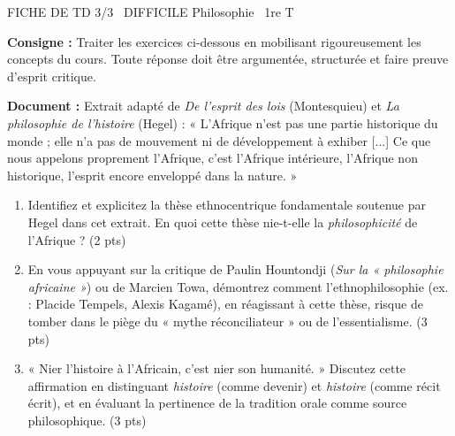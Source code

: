 \documentclass[11pt]{article}
\begin{document}
\begin{tcolorbox}[enhanced,colback=popink,colframe=popink,arc=10pt,boxrule=0pt,left=12pt,right=12pt,top=9pt,bottom=9pt]
{\color{white}\popxbold\small FICHE DE TD 3/3 \textbullet\ DIFFICILE \hfill Philosophie \textbullet\ 1re T\par}
\end{tcolorbox}
\vspace{4pt}
\noindent \textbf{Consigne :} Traiter les exercices ci-dessous en mobilisant rigoureusement les concepts du cours. Toute réponse doit être argumentée, structurée et faire preuve d'esprit critique.

\begin{exercice}
\textbf{Document :} Extrait adapté de \textit{De l'esprit des lois} (Montesquieu) et \textit{La philosophie de l'histoire} (Hegel) : « L'Afrique n'est pas une partie historique du monde ; elle n'a pas de mouvement ni de développement à exhiber [...] Ce que nous appelons proprement l'Afrique, c'est l'Afrique intérieure, l'Afrique non historique, l'esprit encore enveloppé dans la nature. »

\begin{enumerate}
    \item Identifiez et explicitez la thèse ethnocentrique fondamentale soutenue par Hegel dans cet extrait. En quoi cette thèse nie-t-elle la \textit{philosophicité} de l'Afrique ? (2 pts)
    \item En vous appuyant sur la critique de Paulin Hountondji (\textit{Sur la « philosophie africaine »}) ou de Marcien Towa, démontrez comment l'ethnophilosophie (ex. : Placide Tempels, Alexis Kagamé), en réagissant à cette thèse, risque de tomber dans le piège du « mythe réconciliateur » ou de l'essentialisme. (3 pts)
    \item « Nier l'histoire à l'Africain, c'est nier son humanité. » Discutez cette affirmation en distinguant \textit{histoire} (comme devenir) et \textit{histoire} (comme récit écrit), et en évaluant la pertinence de la tradition orale comme source philosophique. (3 pts)
\end{enumerate}
\end{exercice}
\end{document}
